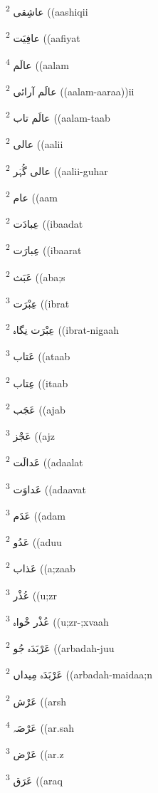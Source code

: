 \documentclass[12pt]{article}
\begin{document}
\begin{multicols}{5}
{\ur عاشِقی}   \textsuperscript{2} ((aashiqii

{\ur عافِیَت}   \textsuperscript{2} ((aafiyat

{\ur عالَم}   \textsuperscript{4} ((aalam

{\ur عالَم آرائی}   \textsuperscript{2} ((aalam-aaraa))ii

{\ur عالَم تاب}   \textsuperscript{2} ((aalam-taab

{\ur عالی}   \textsuperscript{2} ((aalii

{\ur عالی گُہَر}   \textsuperscript{2} ((aalii-guhar

{\ur عام}   \textsuperscript{2} ((aam

{\ur عِبادَت}   \textsuperscript{2} ((ibaadat

{\ur عِبارَت}   \textsuperscript{2} ((ibaarat

{\ur عَبَث}   \textsuperscript{2} ((aba;s

{\ur عِبْرَت}   \textsuperscript{3} ((ibrat

{\ur عِبْرَت نِگاہ}   \textsuperscript{2} ((ibrat-nigaah

{\ur عَتاب}   \textsuperscript{3} ((ataab

{\ur عِتاب}   \textsuperscript{2} ((itaab

{\ur عَجَب}   \textsuperscript{2} ((ajab

{\ur عَجْز}   \textsuperscript{3} ((ajz

{\ur عَدالَت}   \textsuperscript{2} ((adaalat

{\ur عَداوَت}   \textsuperscript{3} ((adaavat

{\ur عَدَم}   \textsuperscript{3} ((adam

{\ur عَدُو}   \textsuperscript{2} ((aduu

{\ur عَذاب}   \textsuperscript{2} ((a;zaab

{\ur عُذْر}   \textsuperscript{3} ((u;zr

{\ur عُذْر خْواہ}   \textsuperscript{3} ((u;zr-;xvaah

{\ur عَرْبَدَہ جُو}   \textsuperscript{2} ((arbadah-juu

{\ur عَرْبَدَہ مِیداں}   \textsuperscript{2} ((arbadah-maidaa;n

{\ur عَرْش}   \textsuperscript{2} ((arsh

{\ur عَرْصَہ}   \textsuperscript{4} ((ar.sah

{\ur عَرْض}   \textsuperscript{3} ((ar.z

{\ur عَرَق}   \textsuperscript{3} ((araq


\end{multicols}
\end{document}
